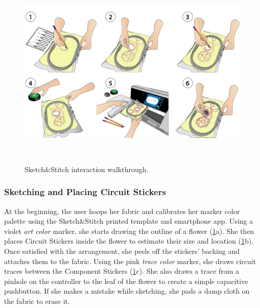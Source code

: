 \documentclass{sigchi}
\begin{document}
\begin{figure} 
\centering
  \includegraphics[width=0.9\columnwidth]{figures/Walkthrough}
  \caption{Sketch\&Stitch interaction walkthrough.}~\label{fig:Walkthrough}
  \vspace{-1.5em}
\end{figure}

\subsubsection{Sketching and Placing Circuit Stickers}
At the beginning, the user hoops her fabric and calibrates her marker color palette using the Sketch\&Stitch printed template and smartphone app.
Using a violet \textit{art color} marker, she starts drawing the outline of a flower (\ref{fig:Walkthrough}a). She then places Circuit Stickers inside the flower to estimate their size and location (\ref{fig:Walkthrough}b). Once satisfied with the arrangement, she peels off the stickers' backing and attaches them to the fabric. Using the pink \textit{trace color} marker, she draws circuit traces between the Component Stickers (\ref{fig:Walkthrough}c). She also draws a trace from a pinhole on the controller to the leaf of the flower to create a simple capacitive pushbutton. If she makes a mistake while sketching, she pads a damp cloth on the fabric to erase it.
\end{document}
